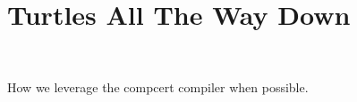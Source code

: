 \section{Turtles All The Way Down}~\label{sec:compcert}

How we leverage the compcert compiler when possible. 


